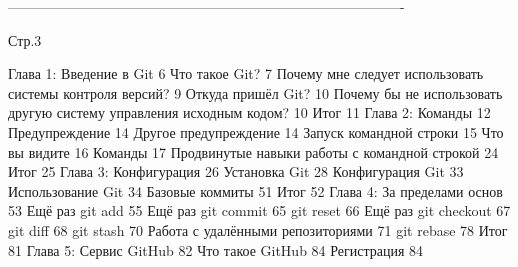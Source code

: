 -------------------------------------------------------------------------------------

Стр.3

Глава 1: Введение в Git                                                         6
    Что такое Git?                                                              7
    Почему мне следует использовать системы контроля версий?                    9
    Откуда пришёл Git?                                                          10
    Почему бы не использовать другую систему управления исходным кодом?         10
    Итог                                                                        11
Глава 2: Команды                                                                12
    Предупреждение                                                              14
    Другое предупреждение                                                       14
    Запуск командной строки                                                     15
    Что вы видите                                                               16
    Команды                                                                     17
    Продвинутые навыки работы с командной строкой                               24
    Итог                                                                        25
Глава 3: Конфигурация                                                           26
    Установка Git                                                               28
    Конфигурация Git                                                            33
    Использование Git                                                           34
    Базовые коммиты                                                             51
    Итог                                                                        52
Глава 4: За пределами основ                                                     53
    Ещё раз git add                                                             55
    Ещё раз git commit                                                          65
    git reset                                                                   66
    Ещё раз git checkout                                                        67
    git diff                                                                    68
    git stash                                                                   70
    Работа с удалёнными репозиториями                                           71
    git rebase                                                                  78
    Итог                                                                        81
Глава 5: Сервис GitHub                                                          82
    Что такое GitHub                                                            84
    Регистрация                                                                 84


